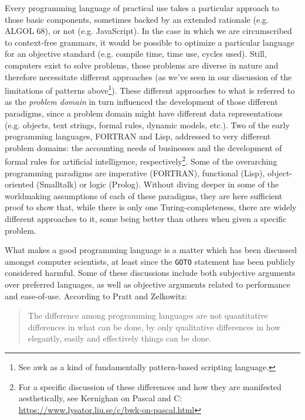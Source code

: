 \documentclass{article}
\begin{document}
Every programming language of practical use takes a particular approach to those basic components, sometimes backed by an extended rationale (e.g. ALGOL 68), or not (e.g. JavaScript). In the case in which we are circumscribed to context-free grammars, it would be possible to optimize a particular language for an objective standard (e.g. compile time, time use, cycles used). Still, computers exist to solve problems, those problems are diverse in nature and therefore necessitate different approaches (as we've seen in our discussion of the limitations of patterns above\footnote{See awk as a kind of fundamentally pattern-based scripting language.}). These different approaches to what is referred to as the \emph{problem domain} in turn influenced the development of those different paradigms, since a problem domain might have different data representations (e.g. objects, text strings, formal rules, dynamic models, etc.). Two of the early programming languages, FORTRAN and Lisp, addressed to very different problem domains: the accounting needs of businesses and the development of formal rules for artificial intelligence, respectively\footnote{For a specific discussion of these differences and how they are manifested aesthetically, see Kernighan on Pascal and C: \url{https://www.lysator.liu.se/c/bwk-on-pascal.html}}. Some of the overarching programming paradigms are imperative (FORTRAN), functional (Lisp), object-oriented (Smalltalk) or logic (Prolog). Without diving deeper in some of the worldmaking assumptions of each of these paradigms, they are here sufficient proof to show that, while there is only one Turing-completeness, there are widely different approaches to it, some being better than others when given a specific problem.

What makes a good programming language is a matter which has been discussed amongst computer scientists, at least since the \lstinline{GOTO} statement has been publicly considered harmful. Some of these discussions include both subjective arguments over preferred languages, as well as objective arguments related to performance and ease-of-use. According to Pratt and Zelkowitz:

\begin{quote}
  The difference among programming languages are not quantitative differences in what can be done, by only qualitative differences in how elegantly, easily and effectively things can be done.\cite{pratt_programming_2000}
\end{quote}
\end{document}
